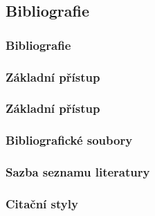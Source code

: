 \subsection{Bibliografie}
\begin{frame}
	\frametitle{Bibliografie}
\end{frame}


\subsubsection{Základní přístup}
\begin{frame}
	\frametitle{Základní přístup}
\end{frame}


\subsubsection{\biblatex}
\begin{frame}
	\frametitle{\biblatex}
\end{frame}


\begin{frame}
	\frametitle{Bibliografické soubory}
\end{frame}


\begin{frame}
	\frametitle{Sazba seznamu literatury}
\end{frame}


\begin{frame}
	\frametitle{Citační styly}
\end{frame}


\subsubsection{}
\begin{frame}
	\frametitle{}
\end{frame}


\endinput